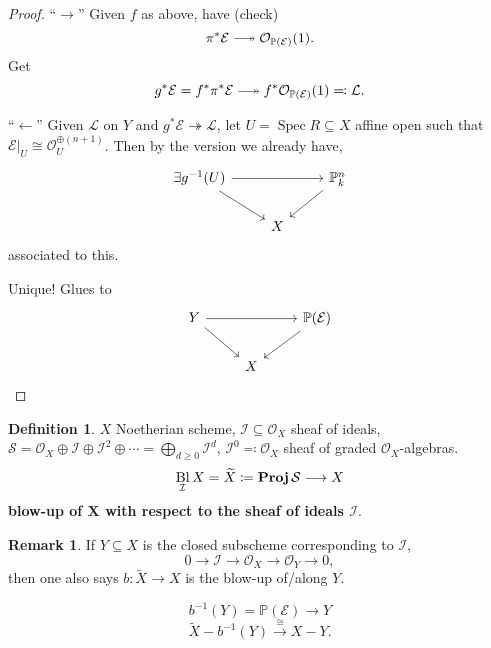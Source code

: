 \documentclass[12pt]{article}
\DeclareMathOperator{\Spec}{Spec}
\DeclareMathOperator{\relProj}{\textnormal{\textbf{Proj}}}
\DeclareMathOperator{\Bl}{Bl}
\theoremstyle{definition}
\newtheorem*{definition}{Definition}
\newtheorem*{remark}{Remark}
\begin{document}
\begin{proof}
``$\rightarrow$'' Given $f$ as above, have (check)
\[\pi^*\mathcal{E}\relbar\joinrel\twoheadrightarrow\mathcal{O}_{\mathbb{P}(\mathcal{E})}(1).\]
Get
\[g^*\mathcal{E}=f^*\pi^*\mathcal{E}\relbar\joinrel\twoheadrightarrow f^*\mathcal{O}_{\mathbb{P}(\mathcal{E})}(1)\eqqcolon\mathcal{L}.\]

``$\leftarrow$'' Given $\mathcal{L}$ on $Y$ and $g^*\mathcal{E}\twoheadrightarrow\mathcal{L}$, let $U=\Spec R\subseteq X$ affine open such that $\mathcal{E}|_U\cong\mathcal{O}_U^{\oplus(n+1)}$. Then by the version we already have,
\[
\begin{tikzcd}
\exists g^{-1}(U)\arrow[rr]\arrow[rd]&&\mathbb{P}_k^n\arrow[ld]\\
&X
\end{tikzcd}
\]
associated to this.

Unique! Glues to
\[
\begin{tikzcd}
Y\arrow[rr]\arrow[rd]&&\mathbb{P}(\mathcal{E})\arrow[ld]\\
&X
\end{tikzcd}
\]
\end{proof}

\begin{definition}
$X$ Noetherian scheme, $\mathcal{I}\subseteq\mathcal{O}_X$ sheaf of ideals, $\mathcal{S}=\mathcal{O}_X\oplus\mathcal{I}\oplus\mathcal{I}^2\oplus\cdots=\bigoplus_{d\geq0}\mathcal{I}^d$, $\mathcal{I}^0\eqqcolon\mathcal{O}_X$ sheaf of graded $\mathcal{O}_X$-algebras.
\[\Bl_{\mathcal{I}}X=\widetilde{X}\coloneqq\relProj\mathcal{S}\longrightarrow X\]
\textbf{blow-up of $\boldsymbol{X}$ with respect to the sheaf of ideals $\boldsymbol{\mathcal{I}}$}.
\end{definition}

\begin{remark}
If $Y\subseteq X$ is the closed subscheme corresponding to $\mathcal{I}$,
\[0\longrightarrow\mathcal{I}\longrightarrow\mathcal{O}_X\longrightarrow\mathcal{O}_Y\longrightarrow0,\]
then one also says $b:\widetilde{X}\rightarrow X$ is the blow-up of/along $Y$.

\[b^{-1}(Y)=\mathbb{P}(\mathcal{E})\longrightarrow Y\]
\[\widetilde{X}-b^{-1}(Y)\overset{\cong}{\longrightarrow}X-Y.\]
\end{remark}
\end{document}
